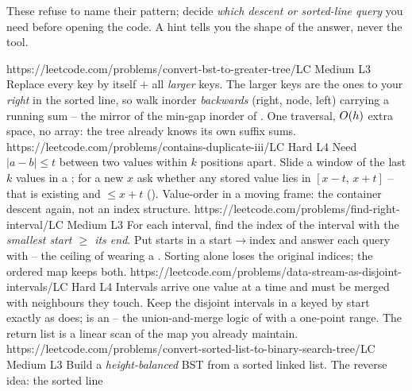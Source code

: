 
These refuse to name their pattern; decide \emph{which descent or sorted-line query} you need before
opening the code. A hint tells you the shape of the answer, never the tool.

\begin{mixedset}
    {https://leetcode.com/problems/convert-bst-to-greater-tree/}{LC Medium L3}
    {Replace every key by itself $+$ all \emph{larger} keys. The larger keys are the ones to your
    \emph{right} in the sorted line, so walk inorder \emph{backwards} (right, node, left) carrying a
    running sum -- the mirror of the min-gap inorder of . One traversal, $O(h)$
    extra space, no array: the tree already knows its own suffix sums.}
    {https://leetcode.com/problems/contains-duplicate-iii/}{LC Hard L4}
    {Need $|a-b|\le t$ between two values within $k$ positions apart. Slide a window of the last $k$
    values in a ; for a new $x$ ask whether any stored value lies in $[x-t,\,x+t]$ -- that is
     existing and $\le x+t$ (). Value-order in a moving
    frame: the container descent again, not an index structure.}
    {https://leetcode.com/problems/find-right-interval/}{LC Medium L3}
    {For each interval, find the index of the interval with the \emph{smallest start $\ge$ its end}.
    Put starts in a  start$\to$index and answer each query with  --
    the ceiling of  wearing a . Sorting alone loses the original indices;
    the ordered map keeps both.}
    {https://leetcode.com/problems/data-stream-as-disjoint-intervals/}{LC Hard L4}
    {Intervals arrive one value at a time and must be merged with neighbours they touch. Keep the
    disjoint intervals in a  keyed by start exactly as  does; 
    is an  -- the union-and-merge logic of  with a
    one-point range. The return list is a linear scan of the map you already maintain.}
    {https://leetcode.com/problems/convert-sorted-list-to-binary-search-tree/}{LC Medium L3}
    {Build a \emph{height-balanced} BST from a sorted linked list. The reverse idea: the sorted line
}
\end{mixedset}

